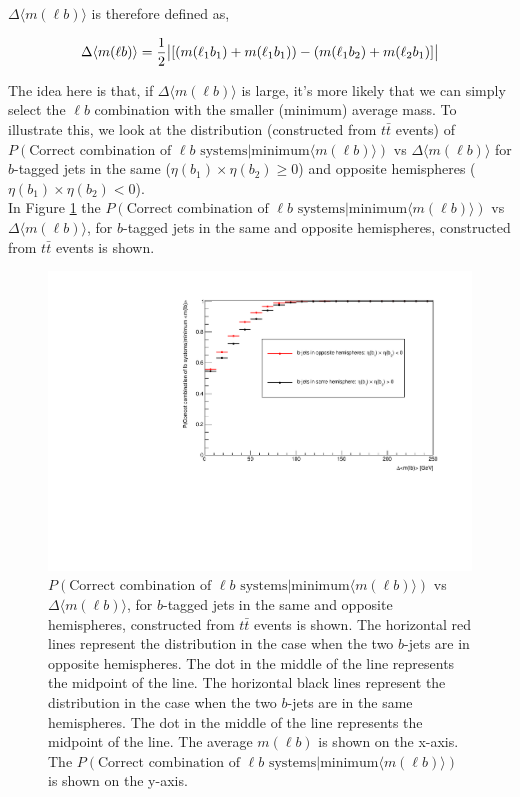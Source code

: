 $\Delta \langle m(\ell b) \rangle$ is therefore defined as,

\begin{equation}
    \Delta \langle m(\ell b) \rangle = \frac{1}{2} \abs{[( m(\ell_{1} b_{1}) + m(\ell_{1} b_{1}) ) - ( m(\ell_{1} b_{2}) + m(\ell_{2} b_{1}) ]}
\end{equation}

 The idea here is that, if $\Delta \langle m(\ell b) \rangle$ is large, it's more likely that we can simply select the $\ell b$ combination with the smaller (minimum) average mass. To illustrate this, we look at the distribution (constructed from $t\bar{t}$ events) of $P(\text{Correct combination of } \ell b \text{ systems} | \text{minimum} \langle m(\ell b) \rangle)$ vs $\Delta \langle m(\ell b) \rangle$ for $b$-tagged jets in the same ($\eta(b_{1}) \times \eta(b_{2}) \geq 0$) and opposite hemispheres ($\eta(b_{1}) \times \eta(b_{2}) < 0$).\\
 In Figure \ref{fig:lb-assoc} the $P(\text{Correct combination of } \ell b \text{ systems} | \text{minimum} \langle m(\ell b) \rangle)$ vs $\Delta \langle m(\ell b) \rangle$, for $b$-tagged jets in the same and opposite hemispheres, constructed from $t\bar{t}$ events is shown.
 \begin{figure}[h!]
	\includegraphics[width=0.6\linewidth]{figures/lbassoc_2vSM.pdf}
	\centering
	\caption{$P(\text{Correct combination of } \ell b \text{ systems} | \text{minimum} \langle m(\ell b) \rangle)$ vs $\Delta \langle m(\ell b) \rangle$, for $b$-tagged jets in the same and opposite hemispheres, constructed from $t\bar{t}$ events is shown. The horizontal red lines represent the distribution in the case when the two $b$-jets are in opposite hemispheres. The dot in the middle of the line represents the midpoint of the line. The horizontal black lines represent the distribution in the case when the two $b$-jets are in the same hemispheres. The dot in the middle of the line represents the midpoint of the line. The average $m(\ell b)$ is shown on the x-axis. The $P(\text{Correct combination of } \ell b \text{ systems} | \text{minimum} \langle m(\ell b) \rangle)$ is shown on the y-axis.}
	\label{fig:lb-assoc}
\end{figure}

